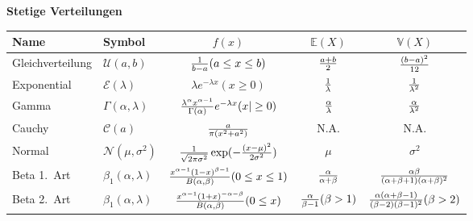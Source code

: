 {    \textbf{Stetige Verteilungen}\\
    \begin{tabular}{|l|l|c|c|c|}\hline
    Name & Symbol & $f(x)$ & $\mathbb E(X)$ & $\mathbb V(X)$ \\\hline
    Gleichverteilung\index{Gleichverteilung} & $\mathcal U(a,b)$ & ${1\over b-a} (a\le x\le b)$ & $a+b\over 2$ &
    $(b-a)^2\over 12$\\\hline
    Exponential\index{Exponentialverteilung} & $\mathcal E(\lambda)$ & $\lambda e^{-\lambda x} (x\ge 0)$ & $1\over\lambda$ & $1\over\lambda^2$ \\\hline
    Gamma\label{stetige_verteilung:gamma}\index{Gammaverteilung} & $\Gamma(\alpha,\lambda)$ &
    ${\lambda^\alpha x^{\alpha-1}\over\Gamma(\alpha)}e^{-\lambda x} (x|\ge 0)$ &
    $\alpha\over\lambda$ & $\alpha\over\lambda^2$\\\hline
    Cauchy\index{Cauchyverteilung} & $\mathcal C(a)$ & ${a\over\pi(x^2+a^2)}$ & N.A. & N.A.\\\hline
    Normal\index{Normalverteilung}\label{stetige_verteilung:normal}& $\mathcal N(\mu,\sigma^2)$ & ${1\over\sqrt{2\pi\sigma^2}}
    \exp(-{(x-\mu)^2\over 2\sigma^2})$ & $\mu$ & $\sigma^2$\\\hline
    Beta 1.\ Art\label{sec:betaverteilung_first}\label{stetige_verteilung:beta_first}\index{Betaverteilung (1.Art)}&$\beta_1(\alpha,\lambda)$&${x^{\alpha-1}
    (1-x)^{\beta-1}\over B(\alpha,\beta)}
     (0\le x\le 1)$&${\alpha\over\alpha+\beta}$&
    ${\alpha\beta\over(\alpha+\beta+1)(\alpha+\beta)^2}$\\\hline
    Beta 2.\ Art\index{Betaverteilung (2.Art)}&$\beta_1(\alpha,\lambda)$&${x^{\alpha-1}
    (1+x)^{-\alpha-\beta}\over B(\alpha,\beta)}
     (0\le x)$&${\alpha\over\beta-1} (\beta>1)$&
    ${\alpha(\alpha+\beta-1)\over(\beta-2)(\beta-1)^2}(\beta>2)$\\\hline
    \end{tabular}

    
    \ifdefined\uebsps
    \newExercPage
    
    
    
    
    
    

    \newExercPage
    
    
    
    
    
    
    
    \fi

}
